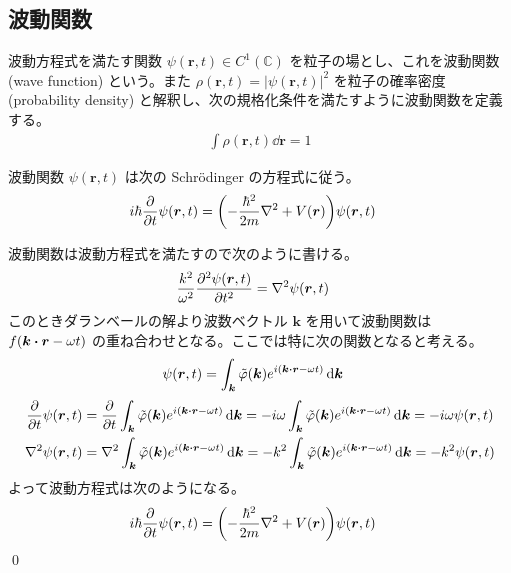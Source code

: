 \documentclass[uplatex,dvipdfmx,a4paper,11pt]{jlreq}
\makeatletter
\newcommand{\CC}{\mathbb{C}}
\newcommand{\rr}{\bm{r}}
\newcommand{\kk}{\bm{k}}
\numberwithin{equation}{section}
\theoremstyle{definition}
\renewenvironment{proof}[1][\proofname]{\par
  \normalfont
  \topsep6\p@\@plus6\p@ \trivlist
  \item[\hskip\labelsep{\bfseries #1}\@addpunct{\bfseries}]\ignorespaces\quad\par
}{%
  \qed\endtrivlist\@endpefalse
}
\renewcommand\proofname{証明}
\makeatother
\begin{document}
\subsection{波動関数}
\begin{definition}[波動関数]
  波動方程式を満たす関数 $\psi(\rr, t)\in C^1(\CC)$ を粒子の場とし、これを波動関数 (wave function) という。また $\rho(\rr, t) = |\psi(\rr, t)|^2$ を粒子の確率密度 (probability density) と解釈し、次の規格化条件を満たすように波動関数を定義する。
  \begin{align}
    \int\rho(\rr, t)\dd{\rr} = 1
  \end{align}
\end{definition}
\begin{theorem}
  波動関数 $\psi(\rr, t)$ は次の Schrödinger の方程式に従う。
  \begin{align}
    i\hbar\diffp{}{t}\psi(\rr, t) & = \qty(-\frac{\hbar^2}{2m}\nabla^2 + V(\rr))\psi(\rr, t)
  \end{align}
\end{theorem}
\begin{proof}
  波動関数は波動方程式を満たすので次のように書ける。
  \begin{align}
    \frac{k^2}{\omega^2}\pdv[2]{\psi(\rr, t)}{t} & = \nabla^2\psi(\rr, t)
  \end{align}
  このときダランベールの解より波数ベクトル $\kk$ を用いて波動関数は $f(\kk\vdot\rr - \omega t)$ の重ね合わせとなる。ここでは特に次の関数となると考える。
  \begin{align}
    \psi(\rr, t) & = \int_{\kk}\tilde{\varphi}(\kk)e^{i(\kk\vdot\rr - \omega t)}\dd{\kk}
  \end{align}
  \begin{align}
    \diffp{}{t}\psi(\rr, t) & = \diffp{}{t}\int_{\kk}\tilde{\varphi}(\kk)e^{i(\kk\vdot\rr - \omega t)}\dd{\kk} = -i\omega\int_{\kk}\tilde{\varphi}(\kk)e^{i(\kk\vdot\rr - \omega t)}\dd{\kk} = -i\omega\psi(\rr, t) \\
    \nabla^2\psi(\rr, t)    & = \nabla^2\int_{\kk}\tilde{\varphi}(\kk)e^{i(\kk\vdot\rr - \omega t)}\dd{\kk} = -k^2\int_{\kk}\tilde{\varphi}(\kk)e^{i(\kk\vdot\rr - \omega t)}\dd{\kk} = -k^2\psi(\rr, t)
  \end{align}
  よって波動方程式は次のようになる。
  \begin{align}
    i\hbar\diffp{}{t}\psi(\rr, t) & = \qty(-\frac{\hbar^2}{2m}\nabla^2 + V(\rr))\psi(\rr, t)
  \end{align}
\end{proof}
\end{document}
